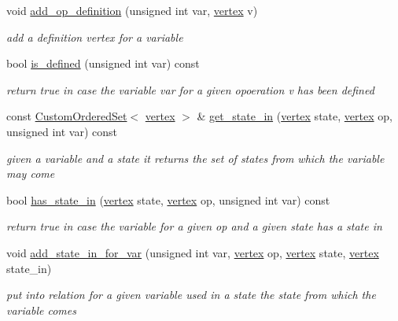 \begin{DoxyCompactItemize}
void \hyperlink{classliveness_a4f1473f6c023b994a455fceaea3c9015}{add\+\_\+op\+\_\+definition} (unsigned int var, \hyperlink{graph_8hpp_abefdcf0544e601805af44eca032cca14}{vertex} v)
\begin{DoxyCompactList}\small\item\em add a definition vertex for a variable \end{DoxyCompactList}\item 
bool \hyperlink{classliveness_a184761795960c7d447a2a20799bbe020}{is\+\_\+defined} (unsigned int var) const
\begin{DoxyCompactList}\small\item\em return true in case the variable var for a given opoeration v has been defined \end{DoxyCompactList}\item 
const \hyperlink{classCustomOrderedSet}{Custom\+Ordered\+Set}$<$ \hyperlink{graph_8hpp_abefdcf0544e601805af44eca032cca14}{vertex} $>$ \& \hyperlink{classliveness_a9f9d674ef6387aa8c82d444fe2540ed5}{get\+\_\+state\+\_\+in} (\hyperlink{graph_8hpp_abefdcf0544e601805af44eca032cca14}{vertex} state, \hyperlink{graph_8hpp_abefdcf0544e601805af44eca032cca14}{vertex} op, unsigned int var) const
\begin{DoxyCompactList}\small\item\em given a variable and a state it returns the set of states from which the variable may come \end{DoxyCompactList}\item 
bool \hyperlink{classliveness_af5d37bbdaab4f34613fa1979d4ad6090}{has\+\_\+state\+\_\+in} (\hyperlink{graph_8hpp_abefdcf0544e601805af44eca032cca14}{vertex} state, \hyperlink{graph_8hpp_abefdcf0544e601805af44eca032cca14}{vertex} op, unsigned int var) const
\begin{DoxyCompactList}\small\item\em return true in case the variable for a given op and a given state has a state in \end{DoxyCompactList}\item 
void \hyperlink{classliveness_a289b0e123f91d1cfdda297f302966bee}{add\+\_\+state\+\_\+in\+\_\+for\+\_\+var} (unsigned int var, \hyperlink{graph_8hpp_abefdcf0544e601805af44eca032cca14}{vertex} op, \hyperlink{graph_8hpp_abefdcf0544e601805af44eca032cca14}{vertex} state, \hyperlink{graph_8hpp_abefdcf0544e601805af44eca032cca14}{vertex} state\+\_\+in)
\begin{DoxyCompactList}\small\item\em put into relation for a given variable used in a state the state from which the variable comes \end{DoxyCompactList}\item 

\end{DoxyCompactItemize}
